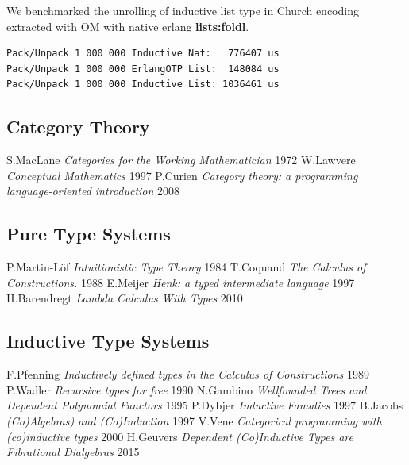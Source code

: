 \documentclass[11pt,oneside]{article}
\begin{document}
We benchmarked the unrolling of inductive list type in Church
encoding extracted with OM with native erlang {\bf lists:foldl}.

\begin{lstlisting}[mathescape=true]
Pack/Unpack 1 000 000 Inductive Nat:   776407 us
Pack/Unpack 1 000 000 ErlangOTP List:  148084 us
Pack/Unpack 1 000 000 Inductive List: 1036461 us
\end{lstlisting}

\newpage
\begin{thebibliography}{9}

\subsection*{Category Theory}
    S.MacLane \textit{Categories for the Working Mathematician} 1972
    W.Lawvere \textit{Conceptual Mathematics} 1997
     P.Curien \textit{Category theory: a programming language-oriented introduction} 2008

\subsection*{Pure Type Systems}
  P.Martin-Löf \textit{Intuitionistic Type Theory} 1984
    T.Coquand \textit{The Calculus of Constructions.} 1988
       E.Meijer \textit{Henk: a typed intermediate language} 1997
 H.Barendregt \textit{Lambda Calculus With Types} 2010

\subsection*{Inductive Type Systems}
   F.Pfenning \textit{Inductively defined types in the Calculus of Constructions} 1989
     P.Wadler \textit{Recursive types for free} 1990
    N.Gambino \textit{Wellfounded Trees and Dependent Polynomial Functors} 1995
     P.Dybjer \textit{Inductive Famalies} 1997
     B.Jacobs \textit{(Co)Algebras) and (Co)Induction} 1997
       V.Vene \textit{Categorical programming with (co)inductive types} 2000
    H.Geuvers \textit{Dependent (Co)Inductive Types are Fibrational Dialgebras} 2015



\end{thebibliography}
\end{document}
